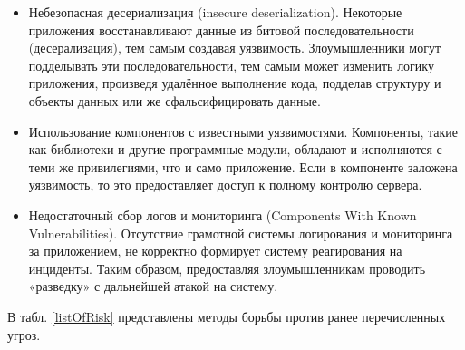 \begin{itemize}
	\item Небезопасная десериализация (insecure deserialization). Некоторые приложения восстанавливают данные из битовой последовательности (десерализация), тем самым создавая уязвимость. Злоумышленники могут подделывать эти последовательности, тем самым может изменить логику приложения, произведя удалённое выполнение кода, подделав структуру и объекты данных или же сфальсифицировать данные.
	\item Использование компонентов с известными уязвимостями. Компоненты, такие как библиотеки и другие программные модули, обладают и исполняются с теми же привилегиями, что и само приложение. Если в компоненте заложена уязвимость, то это предоставляет доступ к полному контролю сервера.
	\item Недостаточный сбор логов и мониторинга (Components With Known Vulnerabilities). Отсутствие грамотной системы логирования и мониторинга за приложением, не корректно формирует систему реагирования на инциденты. Таким образом, предоставляя злоумышленникам проводить «разведку» с дальнейшей атакой на систему.
\end{itemize}

В табл. \ref{listOfRisk} представлены методы борьбы против ранее перечисленных угроз.

